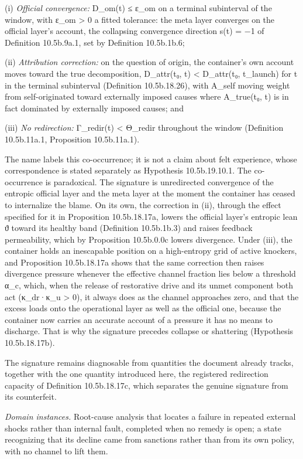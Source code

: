 \documentclass[
]{article}
\begin{document}
(i) \emph{Official convergence:} D\_om(t) ≤ ε\_om on a terminal
subinterval of the window, with ε\_om \textgreater{} 0 a fitted
tolerance: the meta layer converges on the official layer's account, the
collapsing convergence direction s(t) = −1 of Definition 10.5b.9a.1, set
by Definition 10.5b.1b.6;

(ii) \emph{Attribution correction:} on the question of origin, the
container's own account moves toward the true decomposition, D\_attr(t₀,
t) \textless{} D\_attr(t₀, t\_launch) for t in the terminal subinterval
(Definition 10.5b.18.26), with A\_self moving weight from
self-originated toward externally imposed causes where A\_true(t₀, t) is
in fact dominated by externally imposed causes; and

(iii) \emph{No redirection:} Γ\_redir(t) \textless{} Θ\_redir throughout
the window (Definition 10.5b.11a.1, Proposition 10.5b.11a.1).

The name labels this co-occurrence; it is not a claim about felt
experience, whose correspondence is stated separately as Hypothesis
10.5b.19.10.1. The co-occurrence is paradoxical. The signature is
unredirected convergence of the entropic official layer and the meta
layer at the moment the container has ceased to internalize the blame.
On its own, the correction in (ii), through the effect specified for it
in Proposition 10.5b.18.17a, lowers the official layer's entropic lean ϑ
toward its healthy band (Definition 10.5b.1b.3) and raises feedback
permeability, which by Proposition 10.5b.0.0c lowers divergence. Under
(iii), the container holds an inescapable position on a high-entropy
grid of active knockers, and Proposition 10.5b.18.17a shows that the
same correction then raises divergence pressure whenever the effective
channel fraction lies below a threshold α\_c, which, when the release of
restorative drive and its unmet component both act (κ\_dr·κ\_u
\textgreater{} 0), it always does as the channel approaches zero, and
that the excess loads onto the operational layer as well as the official
one, because the container now carries an accurate account of a pressure
it has no means to discharge. That is why the signature precedes
collapse or shattering (Hypothesis 10.5b.18.17b).

The signature remains diagnosable from quantities the document already
tracks, together with the one quantity introduced here, the registered
redirection capacity of Definition 10.5b.18.17c, which separates the
genuine signature from its counterfeit.

\emph{Domain instances.} Root-cause analysis that locates a failure in
repeated external shocks rather than internal fault, completed when no
remedy is open; a state recognizing that its decline came from sanctions
rather than from its own policy, with no channel to lift them.
\end{document}
